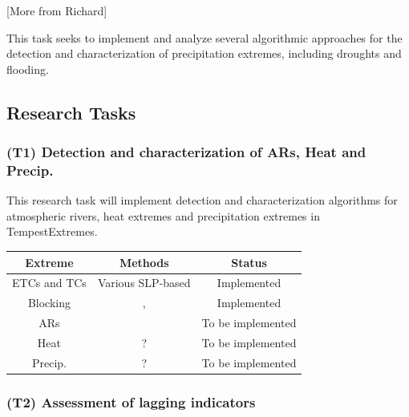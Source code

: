 \documentclass[11pt]{article}
\begin{document}
{\color{red}[More from Richard]}

This task seeks to implement and analyze several algorithmic approaches for the detection and characterization of precipitation extremes, including droughts and flooding.

\subsection{Research Tasks}




\subsubsection{(T1) Detection and characterization of ARs, Heat and Precip.}

This research task will implement detection and characterization algorithms for atmospheric rivers, heat extremes and precipitation extremes in TempestExtremes.

\begin{tabular}{ccc}
\hline Extreme & Methods & Status \\
\hline ETCs and TCs & Various SLP-based & {\color{green} Implemented} \\
Blocking & \cite{scherrer2006two}, \cite{pelly2003new} & {\color{green} Implemented} \\
ARs & \cite{neiman2008meteorological} & {\color{red} To be implemented} \\
Heat & ? & {\color{red} To be implemented} \\
Precip. & ? & {\color{red} To be implemented} \\
\hline
\end{tabular}

\subsubsection{(T2) Assessment of lagging indicators}
\end{document}
